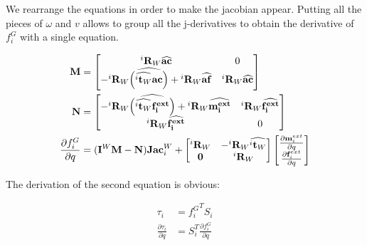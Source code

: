 We rearrange the equations in order to make the jacobian appear.
Putting all the pieces of $\omega$ and $v$ allows to group all the j-derivatives to obtain the derivative of $f^G_i$ with a single equation.

\begin{align}
  \bf M &=
  \begin{bmatrix}
    {}^i\mathbf{R}_W \widehat{\bf ac}  & 0\\
    -{{}^i\mathbf{R}_W}\widehat{\left(\widehat{{}^i\mathbf{t}_W}\bf ac \right)}
    + {}^i\mathbf{R}_W \widehat{\bf af}  & {{}^i\mathbf{R}_W}\widehat{\bf ac} \\
  \end{bmatrix}
  \\
  \bf N &=
  \begin{bmatrix}
    - {{}^i\mathbf{R}_W}\widehat{\left(\widehat{{}^i\mathbf{t}_W}\bf \mathbf{f}^{ext}_i \right)} + {}^i\mathbf{R}_W \widehat{\bf \mathbf{m}^{ext}_i} & {{}^i\mathbf{R}_W}\widehat{\bf \mathbf{f}^{ext}_i} \\
    {}^i\mathbf{R}_W \widehat{\bf \mathbf{f}^{ext}_i} & 0\\
  \end{bmatrix}
  \\
  \frac{\partial f^G_i}{\partial q} &= (\mathbf{I}^W \mathbf{M} - \mathbf{N})\mathbf{Jac}^W_i
  +
  \begin{bmatrix}
    {{}^i\mathbf{R}_W} & -{{}^i\mathbf{R}_W}\widehat{{}^i\mathbf{t}_W} \\
    \mathbf{0} & {{}^i\mathbf{R}_W} \\
  \end{bmatrix}
  \begin{bmatrix}
    \frac{\partial \mathbf{m}^{ext}_i}{\partial q} \\ \frac{\partial \mathbf{f}^{ext}_i}{\partial q}
  \end{bmatrix}
\end{align}

The derivation of the second equation is obvious:

\begin{align}
  \tau_i &= {f^G_i}^T S_i \\
  \frac{\partial \tau_i}{\partial q} &= S_i^T \frac{\partial f^G_i}{\partial q} \\
\end{align}

